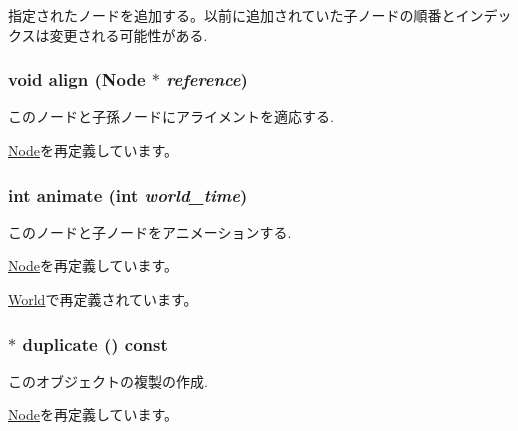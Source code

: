 指定されたノードを追加する。以前に追加されていた子ノードの順番とインデックスは変更される可能性がある. \hypertarget{classm3g_1_1Group_3db1b4be060fe3d4f3dbf9720ef85234}{
\subsubsection[{align}]{\setlength{\rightskip}{0pt plus 5cm}void align ({\bf Node} $\ast$ {\em reference})}}
\label{classm3g_1_1Group_3db1b4be060fe3d4f3dbf9720ef85234}


このノードと子孫ノードにアライメントを適応する. 

\hyperlink{classm3g_1_1Node_3db1b4be060fe3d4f3dbf9720ef85234}{Node}を再定義しています。\hypertarget{classm3g_1_1Group_8aad1ceab4c2a03609c8a42324ce484d}{
\subsubsection[{animate}]{\setlength{\rightskip}{0pt plus 5cm}int animate (int {\em world\_\-time})}}
\label{classm3g_1_1Group_8aad1ceab4c2a03609c8a42324ce484d}


このノードと子ノードをアニメーションする. 

\hyperlink{classm3g_1_1Node_8aad1ceab4c2a03609c8a42324ce484d}{Node}を再定義しています。

\hyperlink{classm3g_1_1World_8aad1ceab4c2a03609c8a42324ce484d}{World}で再定義されています。\hypertarget{classm3g_1_1Group_1212dbd493e73180a6204874bd97df6b}{
\subsubsection[{duplicate}]{ $\ast$ duplicate () const}}
\label{classm3g_1_1Group_1212dbd493e73180a6204874bd97df6b}


このオブジェクトの複製の作成. 

\hyperlink{classm3g_1_1Node_0b9f7531a4b56d34f47aeb1fff0d37e0}{Node}を再定義しています。

